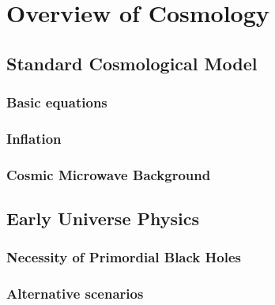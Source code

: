 \chapter{Overview of Cosmology}
\section{Standard Cosmological Model}
\subsection{Basic equations}
\subsection{Inflation}
\subsection{Cosmic Microwave Background}

\section{Early Universe Physics}
\subsection{Necessity of Primordial Black Holes}
\subsection{Alternative scenarios}
